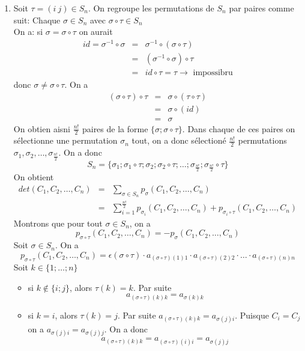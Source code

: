 \begin{enumerate}
  \item Soit $\tau = (i ~ j) \in S_n$. On regroupe les permutations de $S_n$ par paires comme suit: Chaque $\sigma \in S_n$ avec $\sigma \circ \tau \in S_n$ \\
    On a: si $\sigma = \sigma \circ \tau$ on aurait
    \begin{eqnarray*}
      id = \sigma^{-1} \circ \sigma &=& \sigma^{-1} \circ (\sigma \circ \tau) \\
        &=& (\sigma^{-1} \circ \sigma) \circ \tau \\
        &=& id \circ \tau = \tau \rightarrow\text{ impossibru}
    \end{eqnarray*}
    donc $\sigma \neq \sigma \circ \tau$. On a
    \begin{eqnarray*}
      (\sigma \circ \tau) \circ \tau &=& \sigma \circ (\tau \circ \tau) \\
        &=& \sigma \circ (id) \\
        &=& \sigma 
    \end{eqnarray*}
    On obtien aisni $\frac{n!}{2}$ paires de la forme $\{\sigma; \sigma  \circ \tau\}$. Dans chaque de ces paires on sélectionne une permutation $\sigma_n$ tout, on a donc sélectioné $\frac{n!}{2}$ permutations $\sigma_1, \sigma_2, \ldots, \sigma_{\frac{n!}{2}}$. On a donc
    $$S_n = \{ \sigma_1; \sigma_1 \circ \tau; \sigma_2; \sigma_2 \circ \tau; \ldots; \sigma_{\frac{n!}{2}}; \sigma_{\frac{n!}{2}} \circ \tau \}$$
    On obtient 
    \begin{eqnarray*}
      det(C_1, C_2, \ldots, C_n) &=& \sum_{\sigma \in S_n} p_{\sigma}(C_1, C_2, \ldots, C_n) \\
       &=& \sum_{i=1}^{\frac{n!}{2}} p_{\sigma_i}(C_1, C_2, \ldots, C_n) + p_{\sigma_i \circ \tau}(C_1, C_2, \ldots, C_n)
    \end{eqnarray*}
    Montrons que pour tout $\sigma \in S_n$, on a
    $$p_{\sigma \circ \tau}(C_1, C_2, \ldots, C_n) = -p_{\sigma}(C_1, C_2, \ldots, C_n)$$
    Soit $\sigma \in S_n$. On a 
    $$p_{\sigma \circ \tau}(C_1, C_2, \ldots, C_n) = \epsilon(\sigma \circ \tau) \cdot a_{(\sigma \circ\tau)(1) 1} \cdot a_{(\sigma \circ\tau)(2) 2} \cdot \ldots \cdot a_{(\sigma \circ\tau)(n) n}$$
    Soit $k \in \{1; \ldots; n\}$
    \begin{itemize}
      \item si $k\notin \{i; j\}$, alors $\tau(k) = k$. Par suite 
        $$a_{(\sigma \circ \tau)(k) k} = a_{\sigma(k) k}$$
      
      \item si $k = i$, alors $\tau(k) = j$. Par suite $a_{(\sigma \circ \tau)(k) k} = a_{\sigma(j) i}$. Puisque $C_i = C_j$ on a $a_{\sigma(j) i} = a_{\sigma(j) j}$. On a donc
        $$a_{(\sigma \circ \tau)(k) k} = a_{(\sigma \circ \tau)(i) i} = a_{\sigma(j) j}$$
        

\end{itemize}
\end{enumerate}
